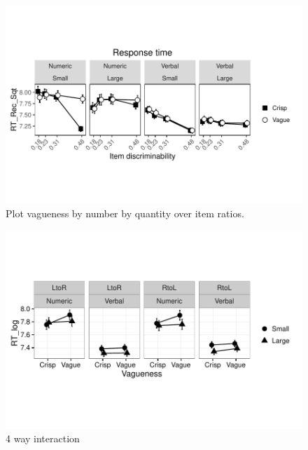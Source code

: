 \documentclass[a4paper,12pt]{article}\usepackage[]{graphicx}\usepackage[]{color}
\makeatletter
\def\maxwidth{ %
  \ifdim\Gin@nat@width>\linewidth
    \linewidth
  \else
    \Gin@nat@width
  \fi
}
\newenvironment{knitrout}{}{} %
\makeatother
\begin{document}
\begin{knitrout}\scriptsize
{}\color{fgcolor}\begin{figure}[hbtp]

{\centering \includegraphics[width=\maxwidth]{figure/graphics-vnitems-1} 

}

\caption[Plot vagueness by number by quantity over item ratios]{Plot vagueness by number by quantity over item ratios.}\label{fig:vnitems}
\end{figure}


\end{knitrout}

\clearpage

\begin{knitrout}\scriptsize
{}\color{fgcolor}\begin{figure}[hbtp]

{\centering \includegraphics[width=\maxwidth]{figure/graphics-4way-1} 

}

\caption[4 way interaction]{4 way interaction}\label{fig:4way}
\end{figure}


\end{knitrout}
\end{document}
